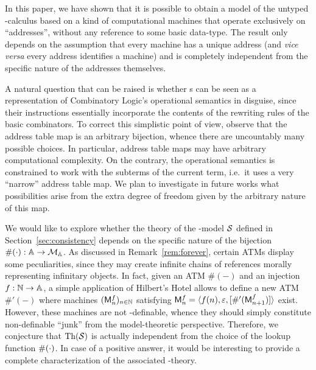 
In this paper, we have shown that it is possible to obtain a model of the untyped \lam-calculus based on a kind of computational machines that operate exclusively on ``addresses'', without any reference to some basic data-type.
The result only depends on the assumption that every machine has a unique address (and \emph{vice versa} every address identifies a machine) and is completely independent from the specific nature of the addresses themselves.

A natural question that can be raised is whether \am s can be seen as a representation of Combinatory Logic's operational semantics in disguise, since their instructions essentially incorporate the contents of the rewriting rules of the basic combinators. To correct this simplistic point of view, observe that the address table map is an arbitrary bijection, whence there are uncountably many possible choices. In particular, address table maps may have arbitrary computational complexity. On the contrary, the operational semantics is constrained to work with the subterms of the current term, i.e.\ it uses a very ``narrow'' address table map. We plan to investigate in future works what possibilities arise from the extra degree of freedom given by the arbitrary nature of this map.

We would like to explore whether the theory of the \lam-model $\mathcal{S}$ defined in Section~\ref{sec:consistency} depends on the specific nature of the bijection $\#(\cdot) : \mathbb{A} \to\mathcal{M}_{\mathbb{A}}$. As discussed in Remark~\ref{rem:forever}, certain ATMs display some peculiarities, since they may create infinite chains of references morally representing infinitary objects. In fact, given an ATM $\#(-)$ and an  injection $f:\mathbb{N}\to\mathbb{A}$, a simple application of Hilbert's Hotel allows to define a new ATM $\#'(-)$ where machines $(\mathsf M^f_n)_{n\in\mathbb{N}}$ satisfying $\mathsf M^f_n = \langle f(n),\varepsilon,[\#'(\mathsf M^f_{n+1})]\rangle$ exist.
However, these machines are not \lam-definable, whence they should simply constitute non-definable ``junk'' from the model-theoretic perspective. Therefore, we conjecture that $\mathrm{Th}(\mathcal{S})$ is actually independent from the choice of the lookup function $\#(\cdot)$.
In case of a positive answer, it would be interesting to provide a complete characterization of the associated \lam-theory.

